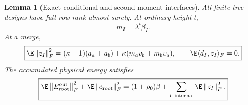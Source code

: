 \documentclass[11pt,oneside,openany,a4paper]{book}
\numberwithin{equation}{chapter}
\newtheorem{lemma}[theorem]{Lemma}
\theoremstyle{definition}
\theoremstyle{remark}
\newcommand{\F}[1]{\left\lVert#1\right\rVert_F}
\begin{document}
\begin{lemma}[Exact conditional and second-moment interfaces]\label{core:lem:second}
All finite-tree designs have full row rank almost surely. At ordinary height $t$,
\begin{equation}\label{core:eq:innovationsecond}
 m_I=\lambda^t\beta_I.
\end{equation}
At a merge,
\begin{equation}\label{core:eq:cost}
 \boxed{\E\F{z_I}^2=(\kappa-1)(a_a+a_b)+\kappa(m_av_b+m_bv_a),
 \qquad \E\langle d_I,z_I\rangle_F=0.}
\end{equation}
The accumulated physical energy satisfies
\begin{equation}\label{core:eq:total}
 \boxed{\E\F{E_{\rm root}^{\rm out}}^2+\E\F{c_{\rm root}}^2
 =(1+\rho_0)\beta+\sum_{I\ {\rm internal}}\E\F{z_I}^2.}
\end{equation}
\end{lemma}
\end{document}
